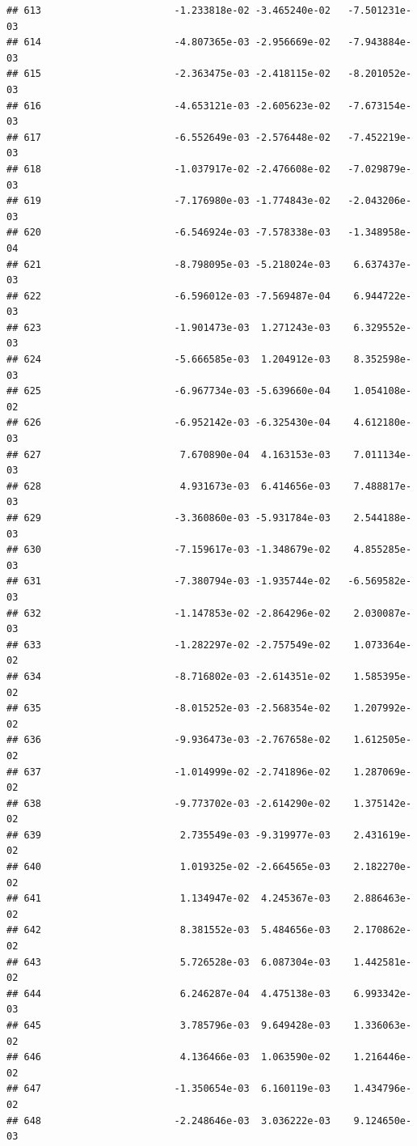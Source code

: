 \documentclass[
]{article}
\begin{document}
\begin{verbatim}
## 613                       -1.233818e-02 -3.465240e-02   -7.501231e-03
## 614                       -4.807365e-03 -2.956669e-02   -7.943884e-03
## 615                       -2.363475e-03 -2.418115e-02   -8.201052e-03
## 616                       -4.653121e-03 -2.605623e-02   -7.673154e-03
## 617                       -6.552649e-03 -2.576448e-02   -7.452219e-03
## 618                       -1.037917e-02 -2.476608e-02   -7.029879e-03
## 619                       -7.176980e-03 -1.774843e-02   -2.043206e-03
## 620                       -6.546924e-03 -7.578338e-03   -1.348958e-04
## 621                       -8.798095e-03 -5.218024e-03    6.637437e-03
## 622                       -6.596012e-03 -7.569487e-04    6.944722e-03
## 623                       -1.901473e-03  1.271243e-03    6.329552e-03
## 624                       -5.666585e-03  1.204912e-03    8.352598e-03
## 625                       -6.967734e-03 -5.639660e-04    1.054108e-02
## 626                       -6.952142e-03 -6.325430e-04    4.612180e-03
## 627                        7.670890e-04  4.163153e-03    7.011134e-03
## 628                        4.931673e-03  6.414656e-03    7.488817e-03
## 629                       -3.360860e-03 -5.931784e-03    2.544188e-03
## 630                       -7.159617e-03 -1.348679e-02    4.855285e-03
## 631                       -7.380794e-03 -1.935744e-02   -6.569582e-03
## 632                       -1.147853e-02 -2.864296e-02    2.030087e-03
## 633                       -1.282297e-02 -2.757549e-02    1.073364e-02
## 634                       -8.716802e-03 -2.614351e-02    1.585395e-02
## 635                       -8.015252e-03 -2.568354e-02    1.207992e-02
## 636                       -9.936473e-03 -2.767658e-02    1.612505e-02
## 637                       -1.014999e-02 -2.741896e-02    1.287069e-02
## 638                       -9.773702e-03 -2.614290e-02    1.375142e-02
## 639                        2.735549e-03 -9.319977e-03    2.431619e-02
## 640                        1.019325e-02 -2.664565e-03    2.182270e-02
## 641                        1.134947e-02  4.245367e-03    2.886463e-02
## 642                        8.381552e-03  5.484656e-03    2.170862e-02
## 643                        5.726528e-03  6.087304e-03    1.442581e-02
## 644                        6.246287e-04  4.475138e-03    6.993342e-03
## 645                        3.785796e-03  9.649428e-03    1.336063e-02
## 646                        4.136466e-03  1.063590e-02    1.216446e-02
## 647                       -1.350654e-03  6.160119e-03    1.434796e-02
## 648                       -2.248646e-03  3.036222e-03    9.124650e-03

\end{verbatim}
\end{document}
